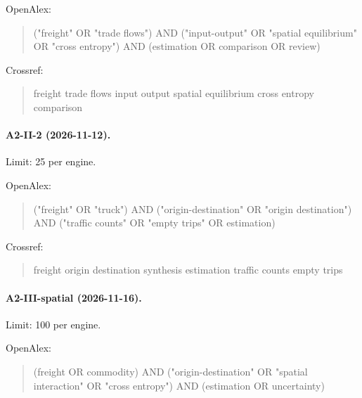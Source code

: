 \noindent OpenAlex:

\begin{quote}\footnotesize\ttfamily\raggedright

("freight" OR "trade flows") AND ("input-output" OR "spatial equilibrium" OR "cross entropy") AND (estimation OR comparison OR review)

\end{quote}

\noindent Crossref:

\begin{quote}\footnotesize\ttfamily\raggedright

freight trade flows input output spatial equilibrium cross entropy comparison

\end{quote}

\paragraph{A2-II-2 (2026-11-12).} Limit: 25 per engine.

\noindent OpenAlex:

\begin{quote}\footnotesize\ttfamily\raggedright

("freight" OR "truck") AND ("origin-destination" OR "origin destination") AND ("traffic counts" OR "empty trips" OR estimation)

\end{quote}

\noindent Crossref:

\begin{quote}\footnotesize\ttfamily\raggedright

freight origin destination synthesis estimation traffic counts empty trips

\end{quote}

\paragraph{A2-III-spatial (2026-11-16).} Limit: 100 per engine.

\noindent OpenAlex:

\begin{quote}\footnotesize\ttfamily\raggedright

(freight OR commodity) AND ("origin-destination" OR "spatial interaction" OR "cross entropy") AND (estimation OR uncertainty)

\end{quote}

